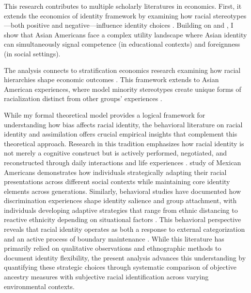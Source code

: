 This research contributes to multiple scholarly literatures in economics. First, it extends the economics of identity framework by examining how racial stereotypes—both positive and negative—influence identity choices \autocite{akerlofEconomicsIdentity2000}. Building on \textcite{charnessSocialIdentityGroup2020} and \textcite{atkinHowWeChoose2021}, I show that Asian Americans face a complex utility landscape where Asian identity can simultaneously signal competence (in educational contexts) and foreignness (in social settings).

The analysis connects to stratification economics research examining how racial hierarchies shape economic outcomes \autocite{darityEconomicsIdentityOrigin2006,darityPositionPossessionsStratification2022}. This framework extends to Asian American experiences, where model minority stereotypes create unique forms of racialization distinct from other groups' experiences \autocite{goldsmithDarkLightSkin2007,hamiltonSheddingLightMarriage2009,dietteSkinShadeStratification2015}.

While my formal theoretical model provides a logical framework for understanding how bias affects racial identity, the behavioral literature on racial identity and assimilation offers crucial empirical insights that complement this theoretical approach. Research in this tradition emphasizes how racial identity is not merely a cognitive construct but is actively performed, negotiated, and reconstructed through daily interactions and life experiences \autocite{waters1990ethnic}. \textcite{telles2008generations} study of Mexican Americans demonstrates how individuals strategically adapting their racial presentations across different social contexts while maintaining core identity elements across generations. Similarly, behavioral studies have documented how discrimination experiences shape identity salience and group attachment, with individuals developing adaptive strategies that range from ethnic distancing to reactive ethnicity depending on situational factors \autocite{zhou1997segmented}. This behavioral perspective reveals that racial identity operates as both a response to external categorization and an active process of boundary maintenance \autocite{cornell2006ethnicity}. While this literature has primarily relied on qualitative observations and ethnographic methods to document identity flexibility, the present analysis advances this understanding by quantifying these strategic choices through systematic comparison of objective ancestry measures with subjective racial identification across varying environmental contexts.

